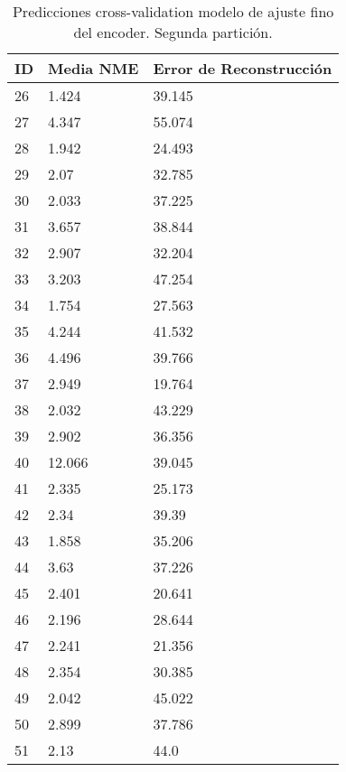 \begin{table}[!ht]
    \centering
    \caption{Predicciones cross-validation modelo de ajuste fino del encoder. Segunda partición.}
    \begin{tabular}{|l|l|l|}
    \hline
    \cellcolor{gray!25}\textbf{ID} & \cellcolor{gray!25}\textbf{Media NME} & \cellcolor{gray!25}\textbf{Error de Reconstrucción} \\ \hline
        26 & 1.424 & 39.145 \\ \hline
        27 & 4.347 & 55.074 \\ \hline
        28 & 1.942 & 24.493 \\ \hline
        29 & 2.07 & 32.785 \\ \hline
        30 & 2.033 & 37.225 \\ \hline
        31 & 3.657 & 38.844 \\ \hline
        32 & 2.907 & 32.204 \\ \hline
        33 & 3.203 & 47.254 \\ \hline
        34 & 1.754 & 27.563 \\ \hline
        35 & 4.244 & 41.532 \\ \hline
        36 & 4.496 & 39.766 \\ \hline
        37 & 2.949 & 19.764 \\ \hline
        38 & 2.032 & 43.229 \\ \hline
        39 & 2.902 & 36.356 \\ \hline
        40 & 12.066 & 39.045 \\ \hline
        41 & 2.335 & 25.173 \\ \hline
        42 & 2.34 & 39.39 \\ \hline
        43 & 1.858 & 35.206 \\ \hline
        44 & 3.63 & 37.226 \\ \hline
        45 & 2.401 & 20.641 \\ \hline
        46 & 2.196 & 28.644 \\ \hline
        47 & 2.241 & 21.356 \\ \hline
        48 & 2.354 & 30.385 \\ \hline
        49 & 2.042 & 45.022 \\ \hline
        50 & 2.899 & 37.786 \\ \hline
        51 & 2.13 & 44.0 \\ \hline
    \end{tabular}
\end{table}


